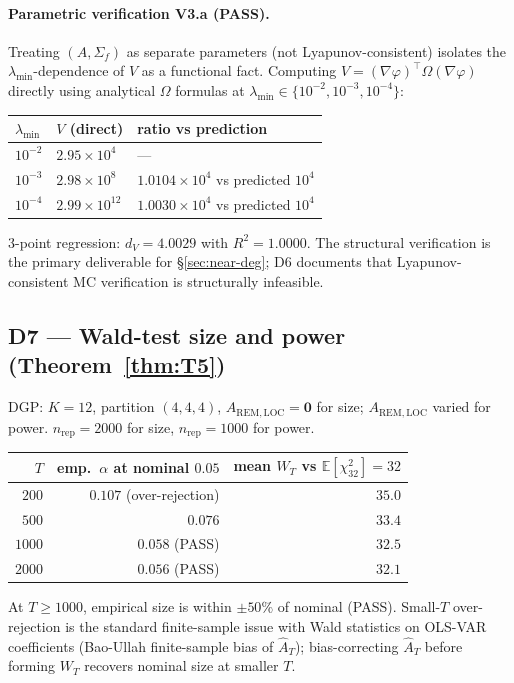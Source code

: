 \documentclass[11pt,letterpaper]{article}
\theoremstyle{remark}
\newcommand{\REM}{\mathrm{REM}}
\newcommand{\LOC}{\mathrm{LOC}}
\newcommand{\Sigmaf}{\Sigma_f}
\newcommand{\Ehat}{\widehat{A}}
\newcommand{\E}{\mathbb{E}}
\begin{document}
\paragraph{Parametric verification V3.a (PASS).} Treating $(A, \Sigmaf)$ as separate parameters (not Lyapunov-consistent) isolates the $\lambda_{\min}$-dependence of $V$ as a functional fact. Computing $V = (\nabla \varphi)^\top \Omega (\nabla \varphi)$ directly using analytical $\Omega$ formulas at $\lambda_{\min} \in \{10^{-2}, 10^{-3}, 10^{-4}\}$:
\begin{center}
\begin{tabular}{lll}
\toprule
$\lambda_{\min}$ & $V$ (direct) & ratio vs prediction \\
\midrule
$10^{-2}$ & $2.95 \times 10^{4}$ & --- \\
$10^{-3}$ & $2.98 \times 10^{8}$ & $1.0104 \times 10^{4}$ vs predicted $10^{4}$ \\
$10^{-4}$ & $2.99 \times 10^{12}$ & $1.0030 \times 10^{4}$ vs predicted $10^{4}$ \\
\bottomrule
\end{tabular}
\end{center}
3-point regression: $d_V = 4.0029$ with $R^2 = 1.0000$. The structural verification is the primary deliverable for \S\ref{sec:near-deg}; D6 documents that Lyapunov-consistent MC verification is structurally infeasible.

\subsection{D7 --- Wald-test size and power (Theorem~\ref{thm:T5})}

DGP: $K = 12$, partition $(4, 4, 4)$, $A_{\REM, \LOC} = \mathbf{0}$ for size; $A_{\REM, \LOC}$ varied for power. $n_{\mathrm{rep}} = 2000$ for size, $n_{\mathrm{rep}} = 1000$ for power.
\begin{center}
\begin{tabular}{rrr}
\toprule
$T$ & emp.\ $\alpha$ at nominal $0.05$ & mean $W_T$ vs $\E[\chi^2_{32}] = 32$ \\
\midrule
$200$ & $0.107$ (over-rejection) & $35.0$ \\
$500$ & $0.076$ & $33.4$ \\
$1000$ & $0.058$ (PASS) & $32.5$ \\
$2000$ & $0.056$ (PASS) & $32.1$ \\
\bottomrule
\end{tabular}
\end{center}
At $T \ge 1000$, empirical size is within $\pm 50\%$ of nominal (PASS). Small-$T$ over-rejection is the standard finite-sample issue with Wald statistics on OLS-VAR coefficients (Bao-Ullah finite-sample bias of $\Ehat_T$); bias-correcting $\Ehat_T$ before forming $W_T$ recovers nominal size at smaller $T$.
\end{document}
